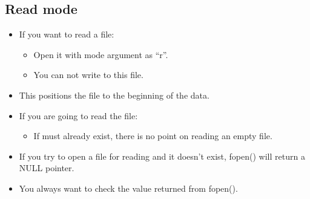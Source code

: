 \subsection{Read mode}
\begin{itemize}
    \item If you want to read a file:
        \begin{itemize}
            \item Open it with mode argument as ``r''.
            \item You can not write to this file.
        \end{itemize}
    
    \item This positions the file to the beginning of the data.
    \item If you are going to read the file:
        \begin{itemize}
            \item If must already exist, there is no point on reading an empty file.
        \end{itemize}
    
    \item If you try to open a file for reading and it doesn't exist, fopen() will return a NULL pointer.
    \item You always want to check the value returned from fopen(). 
\end{itemize}


